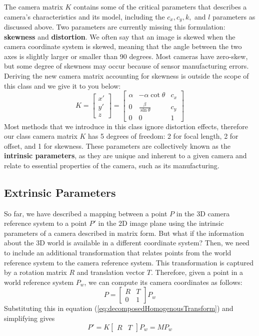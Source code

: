 \documentclass[a4paper, 12pt]{article}
\renewcommand\emph{\textbf}
\begin{document}
The camera matrix $K$ contains some of the critical parameters that describes a camera's characteristics and its model, including the $c_x, c_y, k,$ and $l$ parameters as discussed above. Two parameters are currently missing this formulation: \emph{skewness} and \emph{distortion}. We often say that an image is skewed when the camera coordinate system is skewed, meaning that the angle between the two axes is slightly larger or smaller than 90 degrees. Most cameras have zero-skew, but some degree of skewness may occur because of sensor manufacturing errors. Deriving the new camera matrix accounting for skewness is outside the scope of this class and we give it to you below:
\begin{equation}
K = \begin{bmatrix}x'\\y'\\ z\end{bmatrix}=\begin{bmatrix}
    \alpha & -\alpha\cot\theta & c_x \\
    0 & \frac{\beta}{\sin\theta} & c_y  \\ 
    0 & 0 & 1 
    \end{bmatrix}
\end{equation}
Most methods that we introduce in this class ignore distortion effects, therefore our class camera matrix $K$ has 5 degrees of freedom: 2 for focal length, 2 for offset, and 1 for skewness. These parameters are collectively known as the \emph{intrinsic parameters}, as they are unique and inherent to a given camera and relate to essential properties of the camera, such as its manufacturing.

\subsection{Extrinsic Parameters}

So far, we have described a mapping between a point $P$ in the 3D camera reference system to a point $P'$ in the 2D image plane using the intrinsic parameters of a camera described in matrix form. But what if the information about the 3D world is available in a different coordinate system? Then, we need to include an additional transformation that relates points from the world reference system to the camera reference system. This transformation is captured by a rotation matrix $R$ and translation vector $T$. Therefore, given a point in a world reference system $P_w$, we can compute its camera coordinates as follows:
\begin{equation}
P = \begin{bmatrix}R&T\\0&1\end{bmatrix} P_w
\end{equation}
Substituting this in equation (\ref{eq:decomposedHomogenousTransform}) and simplifying gives
\begin{equation}
P' = K\begin{bmatrix}R&T\end{bmatrix}P_w = MP_w
\label{eq:cameramatrix}
\end{equation}
\end{document}
